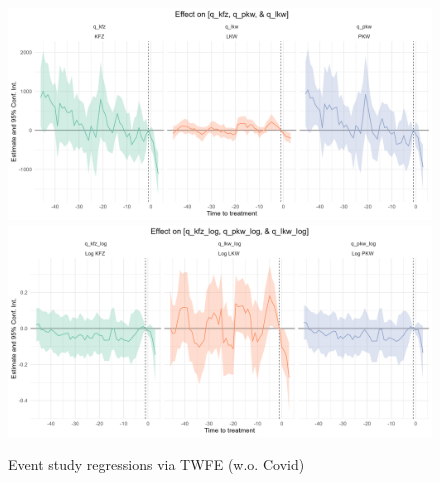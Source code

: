 \documentclass[a4paper, 10pt]{article}
\newcommand{\notes}[1]{\vspace{0.2cm} \caption*{ \scriptsize \textbf{Notes:} {#1}} }
\begin{document}
\begin{figure}[H]
\centering
\caption{Event study regressions via TWFE (w.o. Covid)}
\includegraphics[width = \textwidth]{../04_figures/twfe_monthly_pt_lockdown.png} 
\includegraphics[width = \textwidth]{../04_figures/twfe_monthly_pt_log_lockdown.png}
\end{figure}

%
\end{document}

